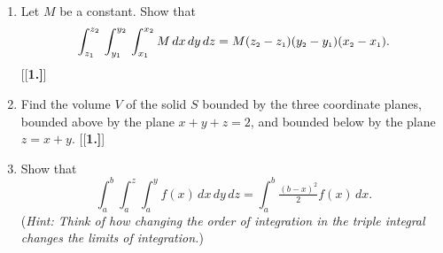 \begin{enumerate}[\bfseries 1.]
 \item Let $M$ be a constant. 
 Show that 
 \[\int_{z_{\scriptscriptstyle 1}}^{z_{\scriptscriptstyle 2}}
 \,\int_{y_{\scriptscriptstyle 1}}^{y_{\scriptscriptstyle 2}}
 \,\int_{x_{\scriptscriptstyle 1}}^{x_{\scriptscriptstyle 2}} 
 M\,dx\,dy\,dz 
 = 
 M(z_{\scriptscriptstyle 2} - z_{\scriptscriptstyle 1})(y_{\scriptscriptstyle 2} - y_{\scriptscriptstyle 1})
  (x_{\scriptscriptstyle 2} - x_{\scriptscriptstyle 1}).\]
[{[\bfseries 1.]}]
 \item Find the volume $V$ of the solid $S$ bounded by the three coordinate planes, bounded above by the plane
  $x+y+z=2$, and bounded below by the plane $z=x+y$.
[{[\bfseries 1.]}]
 \item Show that 
 \[\displaystyle\int_a^b \displaystyle\int_a^z \displaystyle\int_a^y f(x)\,dx\,dy\,dz =
  \displaystyle\int_a^b \tfrac{(b-x)^2 }{2} f(x)\,dx.\] 
  (\emph{Hint: Think of how changing the order of integration in
  the triple integral changes the limits of integration.})
\end{enumerate}
\newpage
